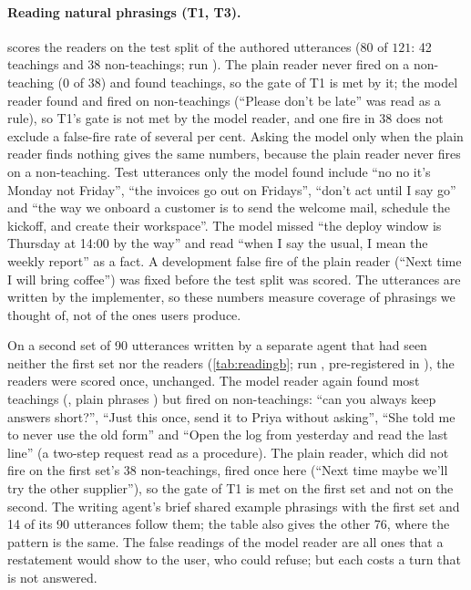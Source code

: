\begin{table}[t]
\centering\small

\caption{The test split with every user turn said and recognised, pooled over four voices; the text column is the single text run of \cref{tab:teaching}. The last column counts the asks of scenarios whose teaching utterances were all heard as said, ignoring case and punctuation.}
\label{tab:spokenscale}
\end{table}

\paragraph{Reading natural phrasings (T1, T3).}
 scores the readers on the test split of the authored utterances (\(80\) of \(121\): 42 teachings and 38 non-teachings; run ). The plain reader never fired on a non-teaching (0 of 38) and found \ReadPlainFound{} teachings, so the gate of T1 is met by it; the model reader found \ReadModelFound{} and fired on \ReadModelFired{} non-teachings
(``Please don't be late'' was read as a rule), so T1's gate is not met by the model reader, and one fire in 38 does not exclude a false-fire rate of several per cent. Asking the model only when the plain reader finds nothing gives the same numbers, because the plain reader never fires on a non-teaching. Test utterances only the model found include ``no no it's Monday not Friday'', ``the invoices go out on Fridays'',
``don't act until I say go'' and ``the way we onboard a customer is to send the welcome mail, schedule the kickoff, and create their workspace''. The model missed ``the deploy window is Thursday at 14:00 by the way'' and read ``when I say the usual, I mean the weekly report'' as a fact. A development false fire of the plain reader (``Next time I will bring coffee'') was fixed before the test split was scored.
The utterances are written by the implementer, so these numbers measure coverage of phrasings we thought of, not of the ones users produce.

On a second set of 90 utterances written by a separate agent that had seen neither the first set nor the readers (\cref{tab:readingb}; run , pre-registered in ), the readers were scored once, unchanged. The model reader again found most teachings (\ReadBModelFound{}, plain phrases \ReadBPlainFound{}) but fired on \ReadBModelFired{} non-teachings:
``can you always keep answers short?'', ``Just this once, send it to Priya without asking'', ``She told me to never use the old form'' and ``Open the log from yesterday and read the last line'' (a two-step request read as a procedure). The plain reader, which did not fire on the first set's 38 non-teachings, fired once here (``Next time maybe we'll try the other supplier''), so the gate of T1 is met on the first set and not on the second.
The writing agent's brief shared example phrasings with the first set and 14 of its 90 utterances follow them; the table also gives the other 76, where the pattern is the same. The false readings of the model reader are all ones that a restatement would show to the user, who could refuse; but each costs a turn that is not answered.


